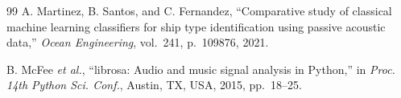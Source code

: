 \documentclass[conference]{IEEEtran}
\begin{document}
\begin{thebibliography}{99}
A. Martinez, B. Santos, and C. Fernandez,
``Comparative study of classical machine learning classifiers for ship
type identification using passive acoustic data,''
\textit{Ocean Engineering}, vol.~241, p.~109876, 2021.

B. McFee \textit{et al.},
``librosa: Audio and music signal analysis in Python,''
in \textit{Proc. 14th Python Sci. Conf.},
Austin, TX, USA, 2015, pp.~18--25.

\end{thebibliography}

\balance
\end{document}
